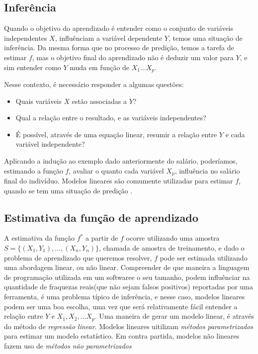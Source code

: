 
\subsection{Inferência}

Quando o objetivo do aprendizado é entender como o conjunto de variáveis independentes $X$, influênciam a variável dependente $Y$, temos
uma situação de inferência. Da mesma forma que no processo de predição, temos a tarefa de estimar $f$, mas o objetivo final do
aprendizado não é deduzir um valor para $Y$, e sim entender como $Y$ muda em função de $X_1...X_p$.

Nesse contexto, é necessário responder a algumas questões:

\begin{itemize}
\item Quais variáveis $X$ estão associadas a $Y$?
\item Qual a relação entre o resultado, e as variáveis independentes?
\item É possível, através de uma equação linear, resumir a relação entre $Y$ e cada variável independente?
\end{itemize}

Aplicando a indução ao exemplo dado anteriormente do salário, poderíamos, estimando a função $f$, avaliar
o quanto cada variável $X_p$, influência no salário final do indivíduo. Modelos lineares
são comumente utilizadas para estimar $f$, quando se tem uma situação de predição \cite{Jordan}.

\subsection{Estimativa da função de aprendizado}
A estimativa da função $f^*$ a partir de $f$ ocorre utilizando uma amostra $S = \{(X_1, Y_1),...,(X_n, Y_n)\}$,
chamada de amostra de treinamento\cite{Malhotra}, e dado o problema de aprendizado que queremos resolver, $f$ pode ser estimada utilizando uma abordagem linear, ou não linear.
Compreender de que maneira a linguagem de programação utilizada em um softwaree o seu tamanho, podem influênciar na quantidade de fraquezas reais(que não sejam falsos positivos) reportadas por uma ferramenta, é uma problema típico de inferência, e nesse caso, modelos lineares podem ser uma boa escolha, uma vez que
será relativamente fácil entender a relação entre $Y$ e $X_1,X_2,...X_p$\cite{Jordan}. Uma maneira de gerar um modelo linear, é através do método de \textit{regressão linear}.
Modelos lineares uitilizam \textit{métodos parametrizados} para estimar um modelo estatístico. Em contra partida, modelos não lineares fazem uso de \textit{métodos não parametrizados} \cite{Jordan}

